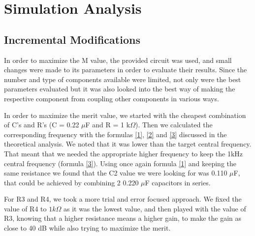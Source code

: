 \section{Simulation Analysis}
\label{sec:simulation analysis}

\subsection{Incremental Modifications}

\indent

In order to maximize the M value, the provided circuit was used, and small changes were made to its parameters in order to evaluate their results. Since the number and type of components available were limited, not only were the best parameters evaluated but it was also looked into the best way of making the respective component from coupling other components in various ways.

In order to maximize the merit value, we started with the cheapest combination of C's and R's (C = 0.22 $\mu$F and R = 1 k$\Omega$). Then we calculated the corresponding frequency with the formulas \ref{1}, \ref{2} and \ref{3} discussed in the theoretical analysis. We noted that it was lower than the target central frequency. That meant that we needed the appropriate higher frequency to keep the 1kHz central frequency (formula \ref{3}). Using once again formula \ref{1} and keeping the same resistance we found that the C2 value we were looking for was 0.110 $\mu$F, that could be achieved by combining 2 0.220 $\mu$F capacitors in series.


For R3 and R4, we took a more trial and error focused approach. We fixed the value of R4 to $1 k\Omega$ as it was the lowest value, and then played with the value of R3, knowing that a higher resistance means a higher gain, to make the gain as close to 40 dB while also trying to maximize the merit.

